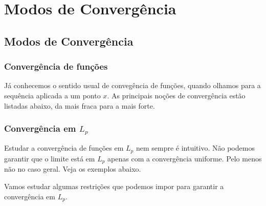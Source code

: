 







\chapter{Modos de Convergência}

\section{Modos de Convergência}

\subsection{Convergência de funções}

Já conhecemos o sentido usual de convegência de funções, quando olhamos para a sequência aplicada a um ponto $x$. As principais noções de convergência estão listadas abaixo, da mais fraca para a mais forte.

\aeConvergence
\pointwiseConvergence
\uniformConvergence

\subsection{Convergência em \texorpdfstring{$L_p$}{Lp}}

\LpConvergence

Estudar a convergência de funções em $L_p$ nem sempre é intuitivo. Não podemos garantir que o limite está em $L_p$ apenas com a convergência uniforme. Pelo menos não no caso geral. Veja os exemplos abaixo.

\counterExampleUniformConvergence

Vamos estudar algumas restrições que podemos impor para garantir a convergência em $L_p$.

\uniformConvergenceLp

\dominatedConvergenceLp

\boundedConvergenceLp